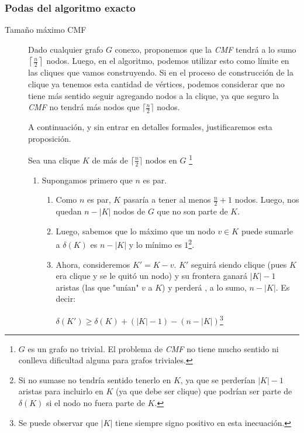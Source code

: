 \subsubsection{Podas del algoritmo exacto}
\begin{description}
    \item[Tama\~no m\'aximo CMF\label{backtracking:poda:tam_max_cmf}]
        Dado cualquier grafo $G$ conexo, proponemos
        que la \emph{CMF} tendr\'a a lo sumo $\left\lceil\frac{n}{2}\right\rceil$ nodos.
        Luego, en el algoritmo, podemos utilizar esto como l\'imite en las cliques que
        vamos construyendo. Si en el proceso de construcci\'on de la clique ya tenemos
        esta cantidad de v\'ertices, podemos considerar que no tiene m\'as sentido
        seguir agregando nodos a la clique, ya que seguro la \emph{CMF} no tendr\'a
        m\'as nodos que $\lceil\frac{n}{2}\rceil$ nodos.

        \par A continuaci\'on, y sin entrar en detalles formales, justificaremos
            esta proposici\'on.

        \par Sea una clique $K$ de m\'as de $\lceil\frac{n}{2}\rceil$ nodos en $G$%
            \footnote{$G$ es un grafo no trivial. El problema de \emph{CMF} no tiene
            mucho sentido ni conlleva dificultad alguna para grafos triviales.}

        \begin{enumerate}
            \item Supongamos primero que $n$ es par.
                \begin{enumerate}
                    \item Como $n$ es par, $K$ pasar\'ia a tener al menos $\frac{n}{2} + 1$
                        nodos. Luego, nos quedan $n - |K|$ nodos de $G$ que no son parte de $K$.
                        \label{tam_min_k_par}

                    \item Luego, sabemos que lo m\'aximo que un nodo $v \in K$  puede
                        sumarle a $\delta(K)$ es $n - |K|$ y lo m\'inimo es $1$\footnote{%
                        Si no sumase no tendr\'ia sentido tenerlo en $K$, ya que
                        se perder\'ian $|K|-1$ aristas para incluirlo en $K$ (ya que
                        debe ser clique) que podr\'ian ser parte de $\delta(K)$ si el
                        nodo no fuera parte de $K$.}.

                    \item Ahora, consideremos $K' = K-v$. $K'$ seguir\'a siendo clique
                        (pues $K$ era clique y se le quit\'o un nodo) y su frontera
                        ganar\'a $|K|-1$ aristas (las que "un\'ian" $v$ a $K$) y perder\'a
                        , a lo sumo, $n - |K|$. Es decir:
                        \par\bigskip
                        $\delta(K') \geq \delta(K) + (|K| - 1) - (n - |K|)$\footnote{%
                        Se puede observar que $|K|$ tiene siempre signo positivo en esta
                        inecuaci\'on.}
                        \bigskip


\end{enumerate}
\end{enumerate}
\end{description}
